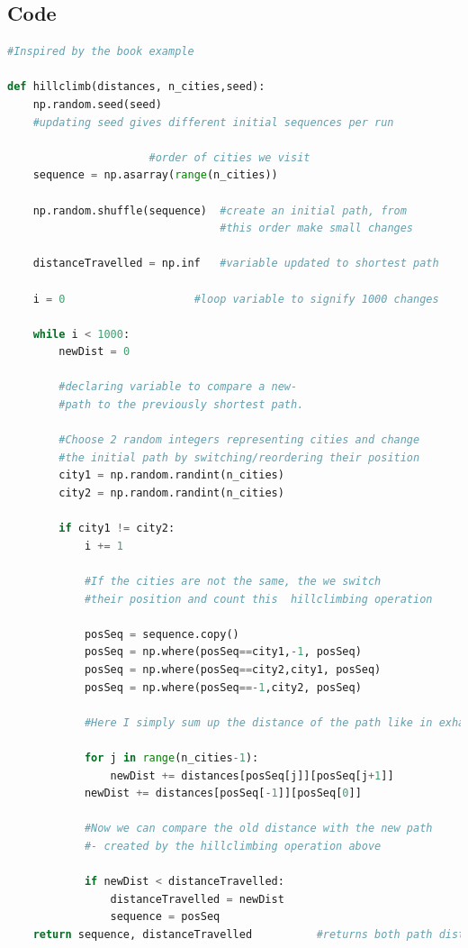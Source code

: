 \documentclass[10pt, a4paper]{article}
\begin{document}
\subsection{Code}
\begin{lstlisting}[language = Python]
#Inspired by the book example

def hillclimb(distances, n_cities,seed):
    np.random.seed(seed)
    #updating seed gives different initial sequences per run

				      #order of cities we visit 
    sequence = np.asarray(range(n_cities)) 

    np.random.shuffle(sequence)  #create an initial path, from 
                                 #this order make small changes
    
    distanceTravelled = np.inf   #variable updated to shortest path

    i = 0                    #loop variable to signify 1000 changes

    while i < 1000:
        newDist = 0 
	
        #declaring variable to compare a new-
        #path to the previously shortest path.
       
        #Choose 2 random integers representing cities and change  
        #the initial path by switching/reordering their position
        city1 = np.random.randint(n_cities)     
        city2 = np.random.randint(n_cities) 
        
        if city1 != city2:                      
            i += 1              

            #If the cities are not the same, the we switch
            #their position and count this  hillclimbing operation
            
            posSeq = sequence.copy()
            posSeq = np.where(posSeq==city1,-1, posSeq)
            posSeq = np.where(posSeq==city2,city1, posSeq)
            posSeq = np.where(posSeq==-1,city2, posSeq)
            
            #Here I simply sum up the distance of the path like in exhaustive search
            
            for j in range(n_cities-1): 
                newDist += distances[posSeq[j]][posSeq[j+1]]
            newDist += distances[posSeq[-1]][posSeq[0]]
            
            #Now we can compare the old distance with the new path
            #- created by the hillclimbing operation above
            
            if newDist < distanceTravelled: 
                distanceTravelled = newDist
                sequence = posSeq
    return sequence, distanceTravelled          #returns both path distance and which order the cities are traveled to
\end{lstlisting}
\end{document}
